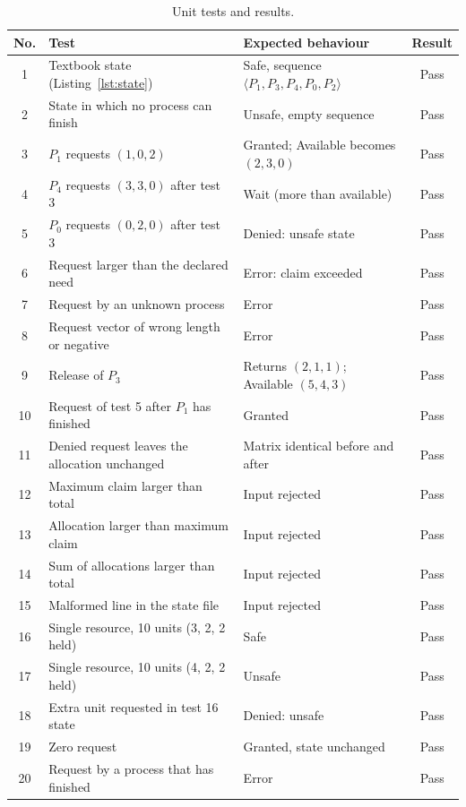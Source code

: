 \documentclass[11pt,a4paper]{report}
\begin{document}
\begin{table}[h!]
\centering
\caption{Unit tests and results.}
\label{tab:tests}
\small
\renewcommand{\arraystretch}{1.15}
\begin{tabular}{|c|p{6.4cm}|p{5.6cm}|c|}
\hline
\textbf{No.} & \textbf{Test} & \textbf{Expected behaviour} & \textbf{Result} \\ \hline
1 & Textbook state (Listing~\ref{lst:state}) & Safe, sequence $\langle P_1,P_3,P_4,P_0,P_2\rangle$ & Pass \\ \hline
2 & State in which no process can finish & Unsafe, empty sequence & Pass \\ \hline
3 & $P_1$ requests $(1,0,2)$ & Granted; Available becomes $(2,3,0)$ & Pass \\ \hline
4 & $P_4$ requests $(3,3,0)$ after test 3 & Wait (more than available) & Pass \\ \hline
5 & $P_0$ requests $(0,2,0)$ after test 3 & Denied: unsafe state & Pass \\ \hline
6 & Request larger than the declared need & Error: claim exceeded & Pass \\ \hline
7 & Request by an unknown process & Error & Pass \\ \hline
8 & Request vector of wrong length or negative & Error & Pass \\ \hline
9 & Release of $P_3$ & Returns $(2,1,1)$; Available $(5,4,3)$ & Pass \\ \hline
10 & Request of test 5 after $P_1$ has finished & Granted & Pass \\ \hline
11 & Denied request leaves the allocation unchanged & Matrix identical before and after & Pass \\ \hline
12 & Maximum claim larger than total & Input rejected & Pass \\ \hline
13 & Allocation larger than maximum claim & Input rejected & Pass \\ \hline
14 & Sum of allocations larger than total & Input rejected & Pass \\ \hline
15 & Malformed line in the state file & Input rejected & Pass \\ \hline
16 & Single resource, 10 units (3, 2, 2 held) & Safe & Pass \\ \hline
17 & Single resource, 10 units (4, 2, 2 held) & Unsafe & Pass \\ \hline
18 & Extra unit requested in test 16 state & Denied: unsafe & Pass \\ \hline
19 & Zero request & Granted, state unchanged & Pass \\ \hline
20 & Request by a process that has finished & Error & Pass \\ \hline
\end{tabular}
\end{table}
\end{document}
